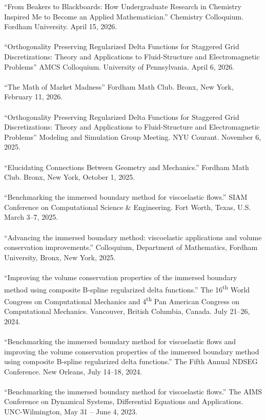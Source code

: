 \documentclass[10pt]{article}
\begin{document}
``From Beakers to Blackboards: How Undergraduate Research in Chemistry Inspired Me to Become an Applied Mathematician.'' Chemistry Colloquium. Fordham University. April 15, 2026.
~\\~\\
``Orthogonality Preserving Regularized Delta Functions for Staggered Grid Discretizations: Theory and Applications to Fluid-Structure and Electromagnetic Problems'' AMCS Colloquium. University of Pennsylvania. April 6, 2026.
~\\~\\
``The Math of Market Madness'' Fordham Math Club. Bronx, New York, February 11, 2026. 
~\\~\\
``Orthogonality Preserving Regularized Delta Functions for Staggered Grid Discretizations: Theory and Applications to Fluid-Structure and Electromagnetic Problems'' Modeling and Simulation Group Meeting. NYU Courant. November 6, 2025.
~\\~\\
``Elucidating Connections Between Geometry and Mechanics.'' Fordham Math Club. Bronx, New York, October 1, 2025. 
~\\~\\
``Benchmarking the immersed boundary method for viscoelastic flows.'' SIAM Conference on Computational Science \& Engineering. Fort Worth, Texas, U.S. March 3--7, 2025.
~\\~\\
``Advancing the immersed boundary method: viscoelastic applications and volume conservation improvements.'' Colloquium, Department of Mathematics, Fordham University, Bronx, New York, 2025.
~\\~\\
``Improving the volume conservation properties of the immersed boundary method using composite B-spline regularized delta functions.'' The 16\textsuperscript{th} World Congress on Computational Mechanics and 4\textsuperscript{th} Pan American Congress on Computational Mechanics. Vancouver, British Columbia, Canada. July 21--26, 2024.
~\\~\\
``Benchmarking the immersed boundary method for viscoelastic flows and improving the volume conservation properties of the immersed boundary method using composite B-spline regularized delta functions.'' The Fifth Annual NDSEG Conference. New Orleans, July 14--18, 2024.
~\\~\\
``Benchmarking the immersed boundary method for viscoelastic flows.'' The AIMS Conference on Dynamical Systems, Differential Equations and Applications. UNC-Wilmington, May 31 -- June 4, 2023.
\end{document}
